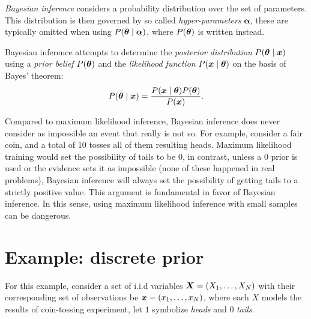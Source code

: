 

\emph{Bayesian inference} considers a probability distribution over the set of parameters. This distribution is then governed by so called \emph{hyper-parameters} \(\bm{\alpha}\), these are typically omitted when using \(P(\bm{\theta} \mid \bm{\alpha})\), where \(P(\bm{\theta})\) is written instead.

Bayesian inference attempts to determine the \emph{posterior distribution} \(P(\bm{\theta} \mid \bm{x})\) using a \emph{prior belief} \(P(\bm{\theta})\) and the \emph{likelihood function} \(P(\bm{x} \mid \bm{\theta})\) on the basis of Bayes' theorem:
\[
  P(\bm{\theta} \mid  \bm{x}) = \frac{P(\bm{x}  \mid  \bm{\theta})P(\bm{\theta})}{P(\bm{x})}.
\]

Compared to maximum likelihood inference, Bayesian inference does never consider as impossible an event that really is not so. For example, consider a fair coin, and a total of \(10\) tosses all of them resulting heads. Maximum likelihood training would set the possibility of tails to be \(0\), in contrast, unless a \(0\) prior is used or the evidence sets it as impossible (none of these happened in real problems), Bayesian inference will always set the possibility of getting tails to a strictly positive value. This argument is fundamental in favor of Bayesian inference. In this sense, using maximum likelihood inference with small samples can be dangerous.

\section{Example: discrete prior}

For this example, consider a set of i.i.d variables \(\bm{X} = (X_{1},\dots, X_{N})\) with their corresponding set of observations be \(\bm{x} = (x_{1},\dots,x_{N})\), where each \(X\) models the results of coin-tossing experiment, let \(1\) symbolize \emph{heads} and \(0\) \emph{tails}.

